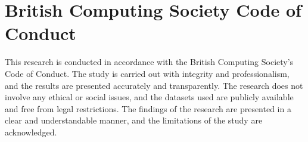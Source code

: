 \section{British Computing Society Code of Conduct}

This research is conducted in accordance with the British Computing Society's Code of Conduct. The study is carried out with integrity and professionalism, and the results are presented accurately and transparently. The research does not involve any ethical or social issues, and the datasets used are publicly available and free from legal restrictions. The findings of the research are presented in a clear and understandable manner, and the limitations of the study are acknowledged.